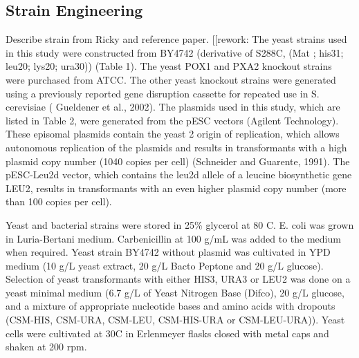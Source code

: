 \documentclass{bmcart}
\begin{document}
\subsection*{Strain Engineering}
Describe strain from Ricky and reference paper.
[[rework: The yeast strains used in this study were constructed from BY4742 (derivative of S288C, (Mat ; his31; leu20; lys20; ura30)) (Table 1). The yeast POX1 and PXA2 knockout strains were purchased from ATCC. The other yeast knockout strains were generated using a previously reported gene disruption cassette for repeated use in S. cerevisiae ( Gueldener et al., 2002). The plasmids used in this study, which are listed in Table 2, were generated from the pESC vectors (Agilent Technology). These episomal plasmids contain the yeast 2  origin of replication, which allows autonomous replication of the plasmids and results in transformants with a high plasmid copy number (1040 copies per cell) (Schneider and Guarente, 1991). The pESC-Leu2d vector, which contains the leu2d allele of a leucine biosynthetic gene LEU2, results in transformants with an even higher plasmid copy number (more than 100 copies per cell).


Yeast and bacterial strains were stored in 25\% glycerol at 80 C. E. coli was grown in Luria-Bertani medium. Carbenicillin at 100 g/mL was added to the medium when required. Yeast strain BY4742 without plasmid was cultivated in YPD medium (10 g/L yeast extract, 20 g/L Bacto Peptone and 20 g/L glucose). Selection of yeast transformants with either HIS3, URA3 or LEU2 was done on a yeast minimal medium (6.7 g/L of Yeast Nitrogen Base (Difco), 20 g/L glucose, and a mixture of appropriate nucleotide bases and amino acids with dropouts (CSM-HIS, CSM-URA, CSM-LEU, CSM-HIS-URA or CSM-LEU-URA)). Yeast cells were cultivated at 30C in Erlenmeyer flasks closed with metal caps and shaken at 200 rpm.
\end{document}
